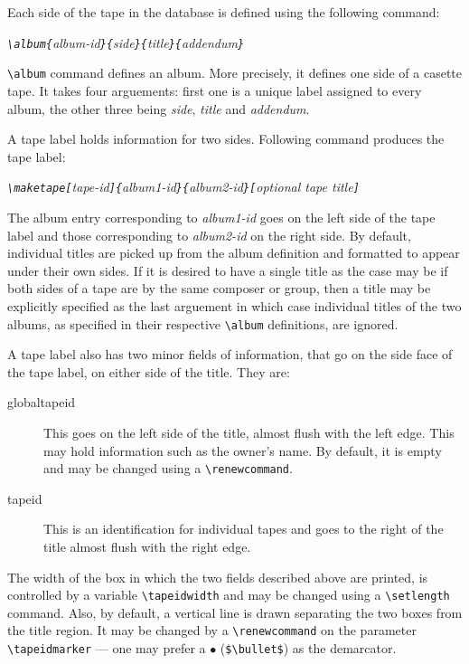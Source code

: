 \newpage
Each side of the tape in the database is defined using the following
command:

{\it
\verb|\album{|album-id\verb|}{|side\verb|}{|title\verb|}{|addendum\verb|}|}

\verb|\album| command defines an album. More precisely, it defines one side
of a casette tape. It takes four arguements: first one
is a unique label assigned to every album, the other three being {\it side},
{\it title} and {\it addendum}.

A tape label holds information for two sides. Following command produces the tape label:

{\it \verb|\maketape[|tape-id\verb|]{|album1-id\verb|}{|album2-id\verb|}[|optional tape title\verb|]|}

The album entry corresponding to {\it album1-id} goes on the left side of the
tape label and those corresponding to {\it album2-id} on the right side. By
default, individual titles are picked up from the album definition and
formatted to appear under their own sides. If it is desired to have a single
title as the case may be if both sides of a tape are by the same composer or
group, then a title may be explicitly specified as the last arguement in
which case individual titles of the two albums, as specified in their
respective \verb|\album| definitions, are ignored.

A tape label also has two minor
fields of information, that go on the side face of the tape label, on either
side of the title. They are:
\begin{description}
\item[globaltapeid\hfill] This goes on the left side of the title, almost
flush with the left edge. This may hold information such as the owner's name.
By default, it is empty and may be changed using a \verb|\renewcommand|.

\item[tapeid\hfill] This is an identification for individual tapes and goes
to the right of the title almost flush with the right edge. 
\end{description}

The width of the box in which the two fields described above are printed, is
controlled by a variable \verb|\tapeidwidth| and may be changed using a 
\verb|\setlength| command. Also, by default, a vertical line is drawn
separating the two boxes from the title region. It may be changed by a
\verb|\renewcommand| on the parameter \verb|\tapeidmarker| --- one may
prefer a $\bullet$ (\verb|$\bullet$|) as the demarcator.

